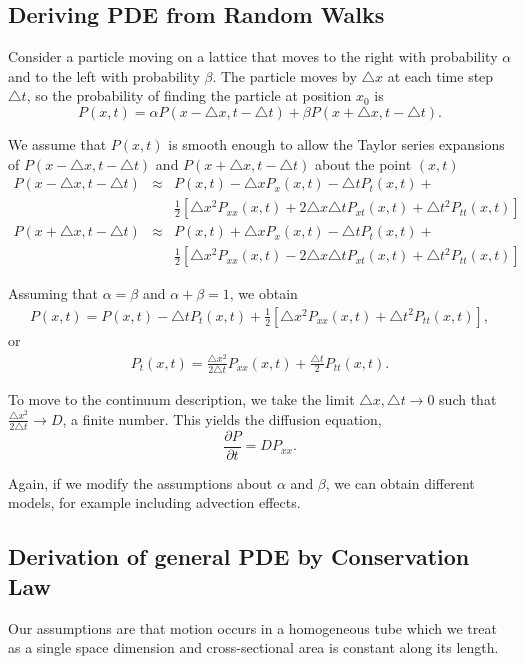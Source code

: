 \documentclass[]{article}
\numberwithin{equation}{section}		%
\def\bea{\begin{eqnarray}}
\def\ena{\end{eqnarray}}
\newcommand{\delx}{\triangle{}x}
\newcommand{\delt}{\triangle{}t}
\begin{document}
\subsection{Deriving PDE from Random Walks}
\indent
Consider a particle moving on a lattice that moves to the right with
probability $\alpha$ and to the left with probability $\beta$. The
particle moves by $\delx$ at each time step $\delt$, so the
probability of finding the particle at position $x_0$ is
\begin{equation}
    P(x,t)=\alpha{}P(x-\delx,t-\delt) + \beta{}P(x+\delx,t-\delt).
\end{equation}

We assume that $P(x,t)$ is smooth enough to allow the Taylor series
expansions of $P(x-\delx,t-\delt)$ and $P(x+\delx,t-\delt)$ about
the point $(x,t)$
\bea
    P(x-\delx,t-\delt)&\approx&P(x,t)-\delx{}P_x(x,t)-\delt{}P_t(x,t) +\nonumber \\
    && \frac{1}{2}[\delx^2P_{xx}(x,t)+2\delx\delt{}P_{xt}(x,t)+\delt^2P_{tt}(x,t)]\nonumber  \\
    P(x+\delx,t-\delt)&\approx&P(x,t)+\delx{}P_x(x,t)-\delt{}P_t(x,t) +\nonumber  \\
   & & \frac{1}{2}[\delx^2P_{xx}(x,t)-2\delx\delt{}P_{xt}(x,t)+\delt^2P_{tt}(x,t)]\nonumber
\ena

Assuming that $\alpha=\beta$ and $\alpha+\beta=1$, we obtain
\bea
    P(x,t)=P(x,t)-\delt P_t(x,t)+\frac{1}{2}\left[\delx^2P_{xx}(x,t)+\delt^2P_{tt}(x,t)\right],
\ena
or
\bea
    P_t(x,t)=\frac{\delx^2}{2\delt}P_{xx}(x,t)+\frac{\delt}{2}P_{tt}(x,t).
\ena

To move to the continuum description, we take the limit $\delx,
\delt  \rightarrow 0$ such that $\frac{\delx^2}{2\delt}  \rightarrow
D$, a finite number. This yields the diffusion equation,
\begin{equation}
    \frac{\partial{}P}{\partial{}t}=DP_{xx}.
\end{equation}

Again, if we modify the assumptions about $\alpha$ and $\beta$, we
can obtain different models, for example including advection effects.

\subsection{Derivation of general PDE by Conservation Law}
Our assumptions are that motion occurs in a homogeneous tube which we treat as a single space dimension and cross-sectional area is constant along its length.
\end{document}

